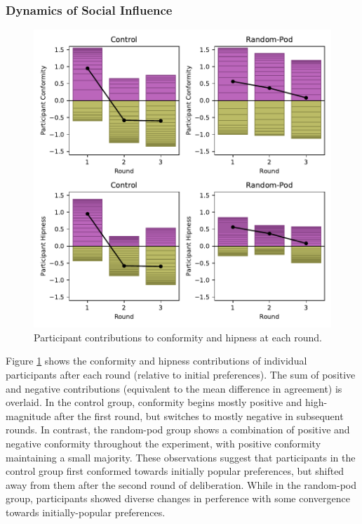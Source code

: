 {\subsubsection{Dynamics of Social Influence}
\label{sec:res-dynamics}

\begin{figure}
    \centering
    \includegraphics[width=6in]{chapters/figures/NetDelibExp/fig-influence-bar.pdf}
    \caption{Participant contributions to conformity and hipness at each round.}
    \label{fig:influence-bar}
\end{figure}

Figure \ref{fig:influence-bar} shows the conformity and hipness contributions of individual participants after each round
(relative to initial preferences).
The sum of positive and negative contributions (equivalent to the mean difference in agreement) is overlaid.
In the control group, conformity begins mostly positive and high-magnitude after the first round, but switches to mostly negative in subsequent rounds.
In contrast, the random-pod group shows a combination of positive and negative conformity throughout the experiment, with positive conformity maintaining a small majority.
These observations suggest that participants in the control group first conformed towards initially popular preferences, but shifted away from them after the second round of deliberation.
While in the random-pod group, participants showed diverse changes in perference with some convergence towards initially-popular preferences.

}
